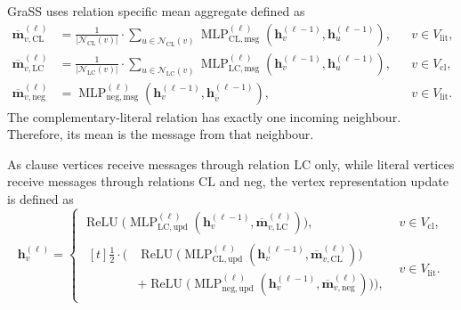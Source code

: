 GraSS uses relation specific mean aggregate defined as
\begin{equation}
\label{eq:ch07:grass-aggregation}
\begin{aligned}
    \overline{\mathbf m}_{v,\mathrm{CL}}^{(\ell)}
        &=\frac{1}{|\mathcal N_{\mathrm{CL}}(v)|}\cdot\sum_{u\in \mathcal N_{\mathrm{CL}}(v)}
        \operatorname{MLP}_{\mathrm{CL},\mathrm{msg}}^{(\ell)}(\mathbf{h}_v^{(\ell-1)},\mathbf{h}_u^{(\ell-1)}),
        &&v\in V_{\mathrm{lit}},\\
    \overline{\mathbf m}_{v,\mathrm{LC}}^{(\ell)}
        &=\frac{1}{|\mathcal N_{\mathrm{LC}}(v)|}\cdot\sum_{u\in \mathcal N_{\mathrm{LC}}(v)}
        \operatorname{MLP}_{\mathrm{LC},\mathrm{msg}}^{(\ell)}(\mathbf{h}_v^{(\ell-1)},\mathbf{h}_u^{(\ell-1)}),
        &&v\in V_{\mathrm{cl}},\\
    \overline{\mathbf m}_{v,\mathrm{neg}}^{(\ell)}
        &=\operatorname{MLP}_{\mathrm{neg},\mathrm{msg}}^{(\ell)}(\mathbf{h}_v^{(\ell-1)},\mathbf{h}_{\overline v}^{(\ell-1)}),
        &&v\in V_{\mathrm{lit}}.
\end{aligned}
\end{equation}
The complementary-literal relation has exactly one incoming neighbour. Therefore, its mean is the message from that neighbour.

As clause vertices receive messages through relation $\mathrm{LC}$ only, while literal vertices receive messages through relations $\mathrm{CL}$ and $\mathrm{neg}$, the vertex representation update is defined as
\begin{equation}
\label{eq:ch07:grass-update}
    \mathbf{h}_v^{(\ell)}=
    \begin{cases}
        \operatorname{ReLU}\!\bigl(\operatorname{MLP}_{\mathrm{LC},\mathrm{upd}}^{(\ell)}(\mathbf{h}_v^{(\ell-1)},\overline{\mathbf m}_{v,\mathrm{LC}}^{(\ell)})\bigr),
            &v\in V_{\mathrm{cl}},\\[4pt]
        \begin{aligned}[t]
        \tfrac12\cdot\bigl(&\operatorname{ReLU}\!\bigl(\operatorname{MLP}_{\mathrm{CL},\mathrm{upd}}^{(\ell)}(\mathbf{h}_v^{(\ell-1)},\overline{\mathbf m}_{v,\mathrm{CL}}^{(\ell)})\bigr)\\
            &+\operatorname{ReLU}\!\bigl(\operatorname{MLP}_{\mathrm{neg},\mathrm{upd}}^{(\ell)}(\mathbf{h}_v^{(\ell-1)},\overline{\mathbf m}_{v,\mathrm{neg}}^{(\ell)})\bigr)\bigr),
        \end{aligned}
            &v\in V_{\mathrm{lit}}.
    \end{cases}
\end{equation}

